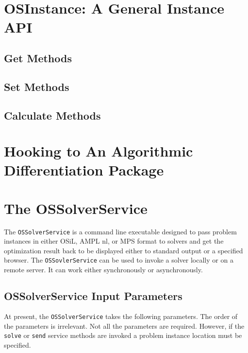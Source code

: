 \documentclass[11pt]{article}
\renewcommand{\_}{{\char"5F}}
\renewcommand{\{}{{\char"7B}}
\renewcommand{\}}{{\char"7D}}
\renewcommand{\^}{{\char"0D}}
\renewcommand{\'}{{\char"0D}}
\begin{document}
\section{OSInstance: A General Instance API}\label{section:osinstance}

\subsection{Get Methods}

\subsection{Set Methods}

\subsection{Calculate Methods}

\section{Hooking to An Algorithmic Differentiation Package}\label{section:ad}

\section{The OSSolverService}\label{section:ossolverservice}

The {\tt OSSolverService} is a command line executable designed to pass problem instances in either  OSiL, AMPL nl, or MPS format  to solvers and get the optimization result back to be displayed either to standard output or a specified browser.  The {\tt OSSovlerService} can be used to invoke a solver locally or on a remote server. It can work either synchronously or asynchronously. 

\subsection{OSSolverService Input Parameters}

At present, the {\tt OSSolverService} takes the following parameters. The order of the parameters is irrelevant.  Not all the parameters are required. However, if the {\tt solve} or {\tt send} service methods are invoked a problem instance location must be specified. 
\end{document}
